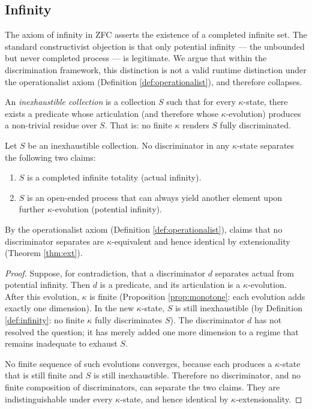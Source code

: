 \subsection{Infinity}\label{sec:infinity}

The axiom of infinity in ZFC asserts the existence of a
completed infinite set. The standard constructivist
objection is that only potential infinity --- the unbounded
but never completed process --- is legitimate. We argue
that within the discrimination framework, this distinction
is not a valid runtime distinction under the
operationalist axiom (Definition \ref{def:operationalist}),
and therefore collapses.

\begin{definition}\label{def:infinity}
An \emph{inexhaustible collection} is a collection $S$ such
that for every $\kappa$-state, there exists a predicate whose
articulation (and therefore whose $\kappa$-evolution) produces
a non-trivial residue over $S$. That is: no finite $\kappa$
renders $S$ fully discriminated.
\end{definition}

\begin{proposition}\label{prop:infinity}
Let $S$ be an inexhaustible collection. No discriminator
in any $\kappa$-state separates the following two claims:
\begin{enumerate}[label=(\roman*),nosep]
  \item $S$ is a completed infinite totality (actual infinity).
  \item $S$ is an open-ended process that can always yield
    another element upon further $\kappa$-evolution (potential
    infinity).
\end{enumerate}
By the operationalist axiom (Definition
\ref{def:operationalist}), claims that no discriminator
separates are $\kappa$-equivalent and hence identical by
extensionality (Theorem \ref{thm:ext}).
\end{proposition}

\begin{proof}
Suppose, for contradiction, that a discriminator $d$
separates actual from potential infinity. Then $d$ is a
predicate, and its articulation is a $\kappa$-evolution.
After this evolution, $\kappa$ is finite (Proposition
\ref{prop:monotone}: each evolution adds exactly one
dimension). In the new $\kappa$-state, $S$ is still
inexhaustible (by Definition \ref{def:infinity}: no
finite $\kappa$ fully discriminates $S$). The
discriminator $d$ has not resolved the question; it has
merely added one more dimension to a regime that remains
inadequate to exhaust $S$.

No finite sequence of such evolutions converges, because
each produces a $\kappa$-state that is still finite and
$S$ is still inexhaustible. Therefore no discriminator,
and no finite composition of discriminators, can separate
the two claims. They are indistinguishable under every
$\kappa$-state, and hence identical by $\kappa$-extensionality.
\end{proof}

